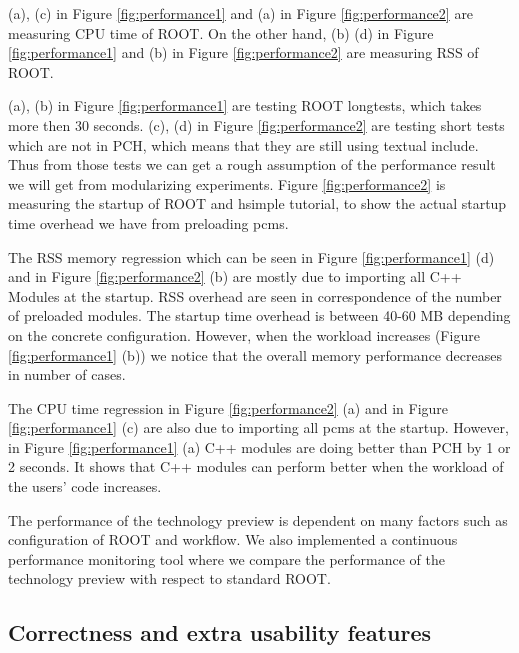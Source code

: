\documentclass{webofc}
\begin{document}
(a), (c) in Figure \ref{fig:performance1} and (a) in Figure \ref{fig:performance2} are measuring CPU time of ROOT. On the other hand, (b) (d) in Figure \ref{fig:performance1} and (b) in Figure \ref{fig:performance2} are measuring RSS of ROOT.

(a), (b) in Figure \ref{fig:performance1} are testing ROOT longtests, which takes more then 30 seconds. (c), (d) in Figure \ref{fig:performance2} are testing short tests which are not in PCH, which means that they are still using textual include. Thus from those tests we can get a rough assumption of the performance result we will get from modularizing experiments. Figure \ref{fig:performance2} is measuring the startup of ROOT and hsimple tutorial, to show the actual startup time overhead we have from preloading pcms.

The RSS memory regression which can be seen in Figure \ref{fig:performance1} (d) and in Figure \ref{fig:performance2} (b) are mostly due to importing all C++ Modules at the startup. RSS overhead are seen in correspondence of the number of preloaded modules. The startup time overhead is between 40-60 MB depending on the concrete configuration. However, when the workload increases (Figure \ref{fig:performance1} (b)) we notice that the overall memory performance decreases in number of cases.

The CPU time regression in Figure \ref{fig:performance2} (a) and in Figure \ref{fig:performance1} (c) are also due to importing all pcms at the startup. However, in Figure \ref{fig:performance1} (a) C++ modules are doing better than PCH by 1 or 2 seconds. It shows that C++ modules can perform better when the workload of the users' code increases.

The performance of the technology preview is dependent on many factors such as configuration of ROOT and workflow. We also implemented a continuous performance monitoring tool \cite{rootbench} where we compare the performance of the technology preview with respect to standard ROOT.

\subsection{Correctness and extra usability features}
\label{correctness}
\end{document}
